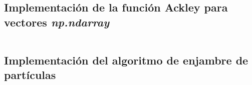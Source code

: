 \documentclass[sigconf,authorversion,nonacm]{acmart}
\begin{document}



\clearpage

\appendix

\begin{figure*}
  \section{Implementación de la función Ackley para vectores \textit{np.ndarray}}
  \label{app:ackley}
  \inputminted{python}{/home/mario/git/MarioJim/ITC-Tec/Sem7/InteligenciaComp/EnjambreParticulas/ackley.py}
\end{figure*}

\begin{figure*}
  \section{Implementación del algoritmo de enjambre de partículas}
  \label{app:pso}
  \inputminted[lastline=54]{python}{/home/mario/git/MarioJim/ITC-Tec/Sem7/InteligenciaComp/EnjambreParticulas/particle_swarm.py}
\end{figure*}

\begin{figure*}
  \inputminted[firstline=56]{python}{/home/mario/git/MarioJim/ITC-Tec/Sem7/InteligenciaComp/EnjambreParticulas/particle_swarm.py}
\end{figure*}
\end{document}
